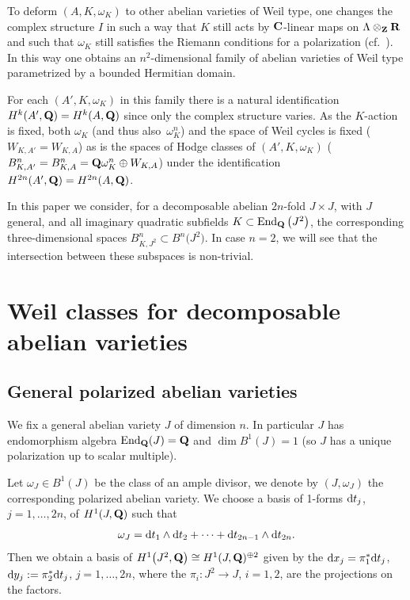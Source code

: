\documentclass[10pt,a4paper]{amsart}
\numberwithin{equation}{section}
\begin{document}
To deform $(A,K,\omega_K)$ to other abelian varieties of Weil type, one changes the complex
structure $I$ in such a way that $K$ still acts by ${\bf C}$-linear maps on $\Lambda\otimes_{\bf Z}{\bf R}$
and such that $\omega_K$ still satisfies the Riemann conditions for a polarization
(cf.\ \cite[Section 5]{hcav}). In this way one obtains
an $n^2$-dimensional family of abelian varieties of Weil type parametrized by
a bounded Hermitian domain.

For each $(A',K,\omega_K)$ in this family there is a natural identification
$H^k(A',{\bf Q})=H^k(A,{\bf Q})$ since only the complex structure varies.
As the $K$-action is fixed, both $\omega_K$
(and thus also~$\omega_K^n$) and the space of Weil cycles is fixed
($W_{K,A'}=W_{K,A}$) as is the spaces of Hodge classes of $(A',K,\omega_K)$
($B^n_{K,A'}=B^n_{K,A}={\bf Q}\omega_K^n\oplus W_{K,A}$)
under the identification $H^{2n}(A',{\bf Q})=H^{2n}(A,{\bf Q})$.

In this paper we consider, for a decomposable abelian $2n$-fold $J\times J$, with $J$ general,
and all imaginary quadratic subfields $K\subset \operatorname{End}_{\bf Q}\big(J^2\big)$, the corresponding
three-dimensional spaces $B^n_{K,J^2}\subset B^n\big(J^2\big)$. In case $n=2$, we will see that the
intersection between these subspaces is non-trivial.

\section{Weil classes for decomposable abelian varieties}\label{decaf}

\subsection{General polarized abelian varieties}\label{JJ}
We fix a general abelian variety $J$ of dimension $n$. In particular $J$ has
endomorphism algebra $\operatorname{End}_{\bf Q}(J)={\bf Q}$ and $\dim B^1(J)=1$ (so $J$
has a unique polarization up to scalar multiple).

Let $\omega_J\in B^1(J)$ be the class of an ample divisor, we denote
by $(J,\omega_J)$ the corresponding polarized abelian variety.
We choose a basis of 1-forms ${\rm d} t_j$, $j=1,\dots,2n$, of $H^1(J,{\bf Q})$ such that
\[
\omega_J={\rm d} t_1\wedge{\rm d} t_2+ \dots + {\rm d} t_{2n-1}\wedge {\rm d} t_{2n}.
\]
Then we obtain a basis of
$H^1\big(J^2,{\bf Q}\big)\cong H^1(J,{\bf Q})^{\oplus 2}$ given by the
${\rm d} x_j=\pi_1^*{\rm d} t_j$, ${\rm d} y_j:=\pi_2^*{\rm d} t_j$, $j=1,\dots,2n$, where the
$\pi_i\colon J^2 \rightarrow J$, $i=1,2$, are the projections on the factors.
\end{document}
